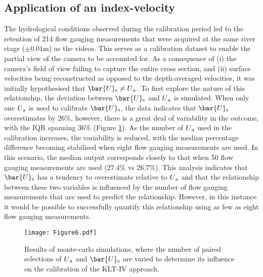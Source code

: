 \documentclass[hess, manuscript]{copernicus}
\begin{document}
\FloatBarrier

\subsection{Application of an index-velocity}

The hydrological conditions observed during the calibration period led to the retention of 214 flow gauging measurements that were acquired at the same river stage ($\pm{0.01}$m) as the videos. This serves as a calibration dataset to enable the partial view of the camera to be accounted for. As a consequence of (i) the camera's field of view failing to capture the entire cross section, and (ii) surface velocities being reconstructed as opposed to the depth-averaged velocities, it was initially hypothesised that ${\bar{U}\textsubscript{s}} \neq U\textsubscript{a}$. To first explore the nature of this relationship, the deviation between $\bar{U}\textsubscript{s}$ and $U\textsubscript{a}$ is simulated. When only one $U\textsubscript{a}$ is used to calibrate $\bar{U}\textsubscript{s}$, the data indicates that $\bar{U}\textsubscript{s}$ overestimates by 26\%, however, there is a great deal of variability in the outcome, with the IQR spanning 36\% (Figure \ref{Figure6}). As the number of $U\textsubscript{a}$ used in the calibration increases, the variability is reduced, with the median percentage difference becoming stabilised when eight flow gauging measurements are used. In this scenario, the median output corresponds closely to that when 50 flow gauging measurements are used (27.4\% vs 26.7\%). This analysis indicates that $\bar{U}\textsubscript{s}$ has a tendency to overestimate relative to $U\textsubscript{a}$ and that the relationship between these two variables is influenced by the number of flow gauging measurements that are used to predict the relationship. However, in this instance it would be possible to successfully quantify this relationship using as few as eight flow gauging measurements.

\begin{figure}[!htb]
\centering 
\texttt{[image: Figure6.pdf]}
\caption{Results of monte-carlo simulations, where the number of paired selections of $U\textsubscript{a}$ and $\bar{U}\textsubscript{s}$ are varied to determine its influence on the calibration of the KLT-IV approach.}
\label{Figure6} 
\end{figure}

\FloatBarrier
\end{document}
